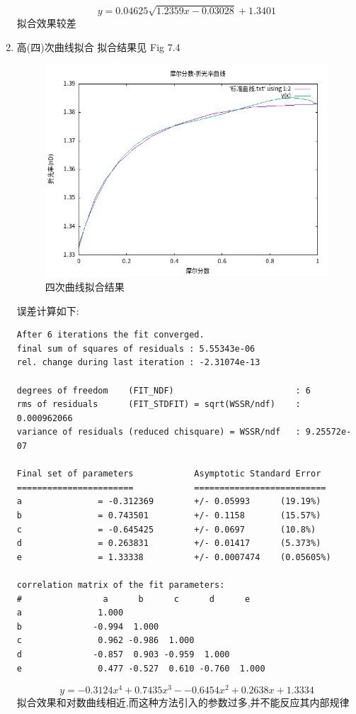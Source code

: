 \documentclass[11pt]{report}
\begin{document}
\begin{enumerate}
\begin{verbatim}
\end{verbatim}
\[
     y=0.04625\sqrt{1.2359x-0.03028}+1.3401
     \]
拟合效果较差

\item 高(四)次曲线拟合
\label{sec:orgda54842}
拟合结果见 Fig 7.4
\begin{figure}[htbp]
\centering
\includegraphics[width=.9\linewidth]{../data/标准曲线-四次曲线拟合.png}
\caption{\label{fig:org7f510b5}四次曲线拟合结果}
\end{figure}
误差计算如下:
\begin{verbatim}
After 6 iterations the fit converged.
final sum of squares of residuals : 5.55343e-06
rel. change during last iteration : -2.31074e-13

degrees of freedom    (FIT_NDF)                        : 6
rms of residuals      (FIT_STDFIT) = sqrt(WSSR/ndf)    : 0.000962066
variance of residuals (reduced chisquare) = WSSR/ndf   : 9.25572e-07

Final set of parameters            Asymptotic Standard Error
=======================            ==========================
a               = -0.312369        +/- 0.05993      (19.19%)
b               = 0.743501         +/- 0.1158       (15.57%)
c               = -0.645425        +/- 0.0697       (10.8%)
d               = 0.263831         +/- 0.01417      (5.373%)
e               = 1.33338          +/- 0.0007474    (0.05605%)

correlation matrix of the fit parameters:
#                a      b      c      d      e      
a               1.000 
b              -0.994  1.000 
c               0.962 -0.986  1.000 
d              -0.857  0.903 -0.959  1.000 
e               0.477 -0.527  0.610 -0.760  1.000 

\end{verbatim}
\[
     y=-0.3124x^{4}+0.7435x^{3}--0.6454x^{2}+ 0.2638x+1.3334
     \]
拟合效果和对数曲线相近,而这种方法引入的参数过多,并不能反应其内部规律
\end{enumerate}
\end{document}

